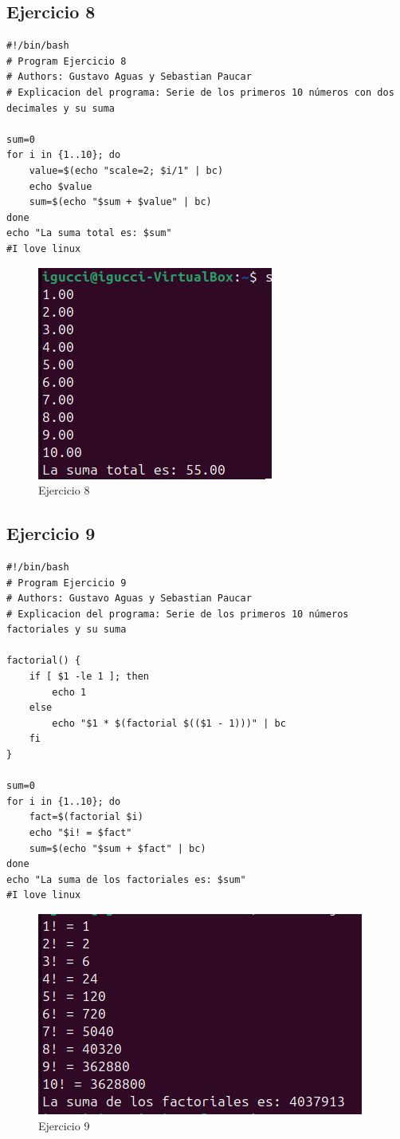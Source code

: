 \documentclass[11pt,twoside]{book}
\begin{document}
\subsection{Ejercicio 8}
\begin{lstlisting}
#!/bin/bash
# Program Ejercicio 8
# Authors: Gustavo Aguas y Sebastian Paucar
# Explicacion del programa: Serie de los primeros 10 números con dos decimales y su suma

sum=0
for i in {1..10}; do
    value=$(echo "scale=2; $i/1" | bc)
    echo $value
    sum=$(echo "$sum + $value" | bc)
done
echo "La suma total es: $sum"
#I love linux
\end{lstlisting}
\begin{figure}[h]
    \centering
    \includegraphics[width=0.6\linewidth]{series/ej8.png}
    \caption{Ejercicio 8}
\end{figure}
\newpage
\subsection{Ejercicio 9}
\begin{lstlisting}
#!/bin/bash
# Program Ejercicio 9
# Authors: Gustavo Aguas y Sebastian Paucar
# Explicacion del programa: Serie de los primeros 10 números factoriales y su suma

factorial() {
    if [ $1 -le 1 ]; then
        echo 1
    else
        echo "$1 * $(factorial $(($1 - 1)))" | bc
    fi
}

sum=0
for i in {1..10}; do
    fact=$(factorial $i)
    echo "$i! = $fact"
    sum=$(echo "$sum + $fact" | bc)
done
echo "La suma de los factoriales es: $sum"
#I love linux
\end{lstlisting}
\begin{figure}[h]
    \centering
    \includegraphics[width=0.6\linewidth]{series/ej9.png}
    \caption{Ejercicio 9}
\end{figure}
\newpage
\end{document}
